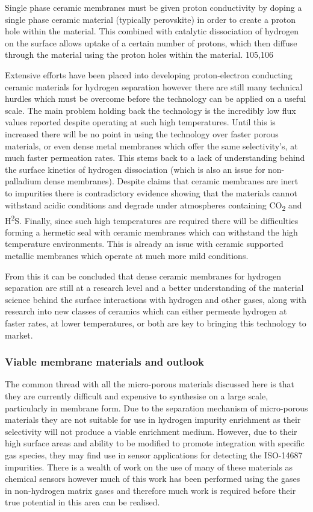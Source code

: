 Single phase ceramic membranes must be given proton conductivity by doping a single phase 
ceramic material (typically perovskite) in order to create a proton hole within the material. 
This combined with catalytic dissociation of hydrogen  on the surface allows uptake of a 
certain number of protons, which then diffuse through the material using the proton holes 
within the material. 105,106

Extensive efforts have been placed into developing proton-electron conducting ceramic 
materials for hydrogen separation however there are still many technical hurdles which must 
be overcome before the technology can be applied on a useful scale. The main problem holding 
back the technology is the incredibly low flux values reported despite operating at such high 
temperatures. Until this is increased there will be no point in using the technology over 
faster porous materials, or even dense metal membranes which offer the same selectivity’s, 
at much faster permeation rates. This stems back to a lack of understanding behind the 
surface kinetics of hydrogen dissociation (which is also an issue for non-palladium dense 
membranes). Despite claims that ceramic membranes are inert to impurities there is 
contradictory evidence showing that the materials cannot withstand acidic conditions and 
degrade under atmospheres containing CO\textsubscript{2} and H\textsuperscript{2}S. 
Finally, since such high temperatures are 
required there will be difficulties forming a hermetic seal with ceramic membranes which can 
withstand the high temperature environments. This is already an issue with ceramic supported 
metallic membranes which operate at much more mild conditions. 

From this it can be concluded that dense ceramic membranes for hydrogen separation are still 
at a research level and a better understanding of the material science behind the surface 
interactions with hydrogen and other gases, along with research into new classes of ceramics 
which can either permeate hydrogen at faster rates, at lower temperatures, or both are key 
to bringing this technology to market. 

\subsubsection{Viable membrane materials and outlook}
The common thread with all the micro-porous materials discussed here is that they are 
currently difficult and expensive to synthesise on a large scale, particularly in membrane 
form. Due to the separation mechanism of micro-porous materials they are not suitable for use 
in hydrogen impurity enrichment as their selectivity will not produce a viable enrichment 
medium. However, due to their high surface areas and ability to be modified to promote 
integration with specific gas species, they may find use in sensor applications for detecting 
the ISO-14687 impurities. There is a wealth of work on the use of many of these materials as 
chemical sensors however much of this work has been performed using the gases in non-hydrogen 
matrix gases and therefore much work is required before their true potential in this area can 
be realised. 

